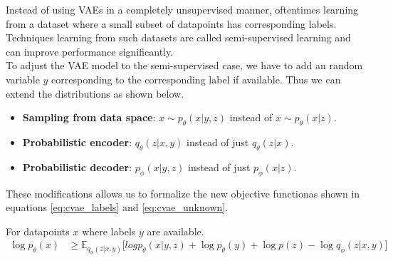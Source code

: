 Instead of using VAEs in a completely unsupervised manner, oftentimes learning from a dataset where a small subset of datapoints has corresponding labels.
Techniques learning from such datasets are called semi-supervised learning and can improve performance significantly.\\

To adjust the VAE model to the semi-supervised case, we have to add an random variable $y$ corresponding to the corresponding label if available.
Thus we can extend the distributions as shown below.




\begin{itemize}
\item \textbf{Sampling from data space}: $x \sim p_\theta(x|y,z)$ instead of $x \sim p_\theta(x|z)$.\\
\item \textbf{Probabilistic encoder}: $q_\theta(z|x,y)$ instead of just $q_\theta(z|x)$.\\
\item \textbf{Probabilistic decoder}: $p_\phi(x|y,z)$ instead of just $p_\phi(x|z)$.\\
\end{itemize}

These modifications allows us to formalize the new objective functionas shown in equations \ref{eq:cvae_labels} and \ref{eq:cvae_unknown}.

For datapoints $x$ where labels $y$ are available.
\begin{align}
  \label{eq:cvae_labels}
  \log p_\theta(x) &\geq \mathbb{E}_{q_\phi(z|x,y)} \bigg[log p_\theta(x|y,z) + \log p_\theta(y) + \log p(z) - \log q_\phi(z|x,y)\bigg]
\end{align}

